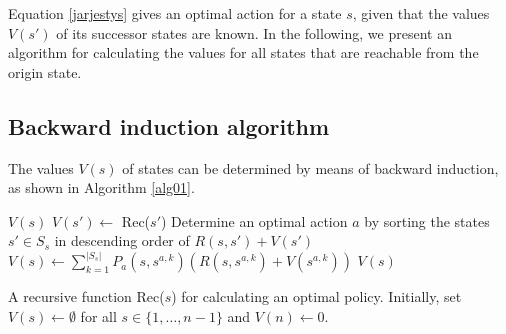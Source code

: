 \documentclass[dissertation,draft*]{aaltoseries}
\begin{document}
Equation \eqref{jarjestys} 
gives an optimal action for a state $s$, given that the values $V(s')$ of its successor states are known.
In the following, we present an algorithm for calculating the values for all states that are reachable from the origin state.

\subsection{Backward induction algorithm}
\label{balg}
The values $V(s)$ of states can be determined
by means of backward induction, as shown in Algorithm \ref{alg01}.

\begin{algorithm}
{\footnotesize
\begin{algorithmic}
\RETURN $V(s)$\;
\ENDIF
{}
\STATE $V(s') \leftarrow $ Rec($s'$)\; 
\ENDFOR
\STATE Determine an optimal action $a$ by sorting the states $s' \in S_{s}$ in descending order of $R(s,s') + V(s')$\;
\STATE $V(s) \leftarrow \sum_{k=1}^{|S_s|} P_{a}(s,s^{a,k}) \left( R(s,s^{a,k}) +V(s^{a,k}) \right)$\;
\RETURN $V(s)$\;
\end{algorithmic}
}
\caption{A recursive function Rec($s$) for calculating an optimal policy. 
Initially, set $V(s) \leftarrow \emptyset$ for all $s \in \{1,\ldots,n-1\}$ and $V(n) \leftarrow 0$.}
\label{alg01}
\end{algorithm}
\end{document}
